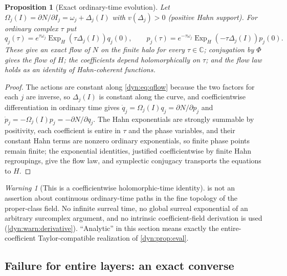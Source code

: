\documentclass[11pt,letterpaper]{article}
\newtheorem{proposition}[proposition]{Proposition}
\theoremstyle{definition}
\theoremstyle{remark}
\newtheorem{warning}[warning]{Warning}
\newcommand{\C}{\mathbb C}
\newcommand{\ExpH}{\operatorname{Exp}_{\!H}}
\numberwithin{equation}{section}
\begin{document}
\begin{proposition}[Exact ordinary-time evolution]\label{dyn:prop:flow}
Let $\Omega_j(I)=\partial N/\partial I_j=\omega_j+\Delta_j(I)$ with
$v(\Delta_j)>0$ (positive Hahn support). For ordinary complex $\tau$ put
\begin{equation}\label{dyn:eq:qflow}
 q_j(\tau)=e^{\tau\omega_j}\ExpH(\tau\Delta_j(I))q_j(0),\qquad
 p_j(\tau)=e^{-\tau\omega_j}\ExpH(-\tau\Delta_j(I))p_j(0).
\end{equation}
These give an exact flow of $N$ on the finite halo for every $\tau\in\C$;
conjugation by $\Phi$ gives the flow of $H$; the coefficients depend
holomorphically on $\tau$; and the flow law holds as an identity of
Hahn-coherent functions.
\end{proposition}
\begin{proof}
The actions are constant along \eqref{dyn:eq:qflow} because the two factors
for each $j$ are inverse, so $\Delta_j(I)$ is constant along the curve, and
coefficientwise differentiation in ordinary time gives
$\dot q_j=\Omega_j(I)q_j=\partial N/\partial p_j$ and
$\dot p_j=-\Omega_j(I)p_j=-\partial N/\partial q_j$. The Hahn exponentials
are strongly summable by positivity, each coefficient is entire in $\tau$
and the phase variables, and their constant Hahn terms are nonzero ordinary
exponentials, so finite phase points remain finite; the exponential
identities, justified coefficientwise by finite Hahn regroupings, give the
flow law, and symplectic conjugacy transports the equations to $H$.
\end{proof}

\begin{warning}[This is a coefficientwise holomorphic-time identity]
\label{dyn:warn:hamflow}
 is not an assertion about continuous ordinary-time
paths in the fine topology of the proper-class field. No infinite surreal
time, no global surreal exponential of an arbitrary surcomplex argument,
and no intrinsic coefficient-field derivation is used
(\cref{dyn:warn:derivative}). ``Analytic'' in this section means exactly
the entire-coefficient Taylor-compatible realization of
\cref{dyn:prop:eval}.
\end{warning}

\subsection{Failure for entire layers: an exact converse}
\end{document}
